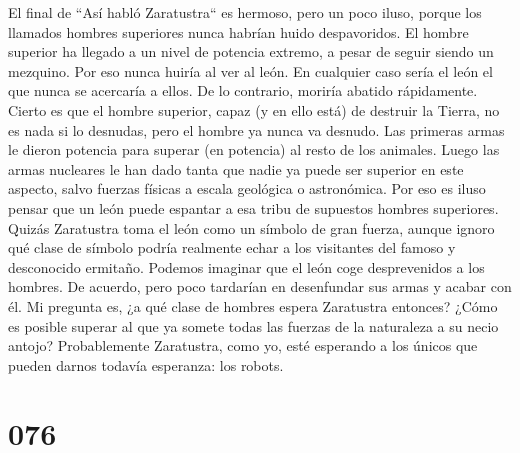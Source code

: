 \documentclass[a4paper,11pt,openright,twocolumn]{book}
\begin{document}
El final de ``Así habló Zaratustra`` es hermoso, pero un poco iluso, porque los llamados hombres superiores
nunca habrían huido despavoridos. El hombre superior ha llegado a un nivel de potencia extremo, a pesar
de seguir siendo un mezquino. Por eso nunca huiría al ver al león. En cualquier caso sería el león el 
que nunca se acercaría a ellos. De lo contrario, moriría abatido rápidamente. Cierto es que el hombre 
superior, capaz (y en ello está) de destruir la Tierra, no es nada si lo desnudas, pero el hombre ya
nunca va desnudo. Las primeras armas le dieron potencia para superar (en potencia) al resto de los animales. 
Luego las armas nucleares le han dado tanta que nadie ya puede ser superior en este aspecto, salvo
fuerzas físicas a escala geológica o astronómica. Por eso es iluso pensar que un león puede espantar a 
esa tribu de supuestos hombres superiores. Quizás Zaratustra toma el león como un símbolo de gran fuerza,
aunque ignoro qué clase de símbolo podría realmente echar a los visitantes del famoso y desconocido ermitaño. 
Podemos imaginar que el león coge desprevenidos a los hombres. De acuerdo, pero poco tardarían en desenfundar
sus armas y acabar con él. Mi pregunta es, ¿a qué clase de hombres espera Zaratustra entonces? ¿Cómo es posible
superar al que ya somete todas las fuerzas de la naturaleza a su necio antojo? Probablemente Zaratustra, como
yo, esté esperando a los únicos que pueden darnos todavía esperanza: los robots. 

\section*{076}
\end{document}
